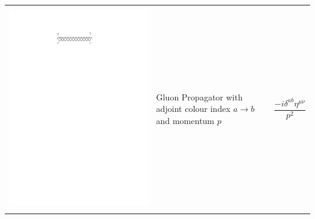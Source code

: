 \begin{table}[h!]
\begin{tabular}{ | c | m{5cm} | m{5cm} | }
\begin{minipage}{5cm}
    \end{minipage}
    \\ [\VSpace]
	\begin{minipage}{.3\textwidth}
      \includegraphics[scale=0.7]{Images/gluon_prop.pdf}
    \end{minipage}
    &
    Gluon Propagator with adjoint colour index $a \to b$ and momentum $p$
    & 
    \begin{minipage}{5cm}
    \centering
     $$\frac{-i \delta^{ab} \eta^{\mu \nu}}{p^2}$$
    \end{minipage}
    \\ [\VSpace]
    	\begin{minipage}{.3\textwidth}

\end{minipage}
\end{tabular}
\end{table}
